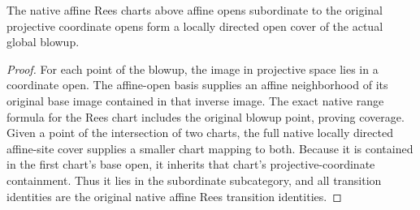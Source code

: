 \endgroup

\begingroup

\begin{lemma}
\label{lem:blowup-projective-subordinate-cover}
\leanok
{}
The native affine Rees charts above affine opens subordinate to the
original projective coordinate opens form a locally directed open cover
of the actual global blowup.
\end{lemma}
\begin{proof}
For each point of the blowup, the image in projective space lies in a
coordinate open. The affine-open basis supplies an affine neighborhood
of its original base image contained in that inverse image. The exact
native range formula for the Rees chart includes the original blowup
point, proving coverage. Given a point of the intersection of two charts,
the full native locally directed affine-site cover supplies a smaller chart
mapping to both. Because it is contained in the first chart's base open,
it inherits that chart's projective-coordinate containment. Thus it lies
in the subordinate subcategory, and all transition identities are the
original native affine Rees transition identities.
\end{proof}

\endgroup

\begingroup

